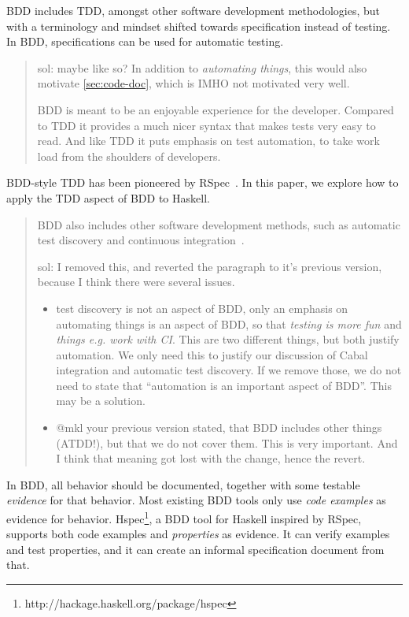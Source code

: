 \documentclass[preprint]{sigplanconf}
\begin{document}
BDD includes TDD, amongst other software development methodologies,
but with a terminology and mindset shifted towards
specification instead of testing.
In BDD, specifications can be used for
automatic testing.

\begin{quote}
    sol: maybe like so?  In addition to \emph{automating things}, this
    would also motivate \ref{sec:code-doc}, which is IMHO not
    motivated very well.

    BDD is meant to be an enjoyable experience for the developer.
    Compared to TDD it provides a much nicer syntax that
    makes tests very easy to read.  And like TDD it puts emphasis on
    test automation, to take work load from the shoulders of
    developers.
\end{quote}

BDD-style TDD has been pioneered by
RSpec~\cite{rspec}.  In this paper, we explore how to apply the TDD
aspect of BDD to Haskell.

\begin{quote}
    BDD also includes other software development methods, such as
    automatic test discovery and continuous integration~\cite{ci}.

    sol: I removed this, and reverted the paragraph to it's previous
    version, because I think there were several issues.

    \begin{itemize}
        \item test discovery is not an aspect of BDD, only an emphasis
            on automating things is an aspect of BDD, so that
            \emph{testing is more fun} and \emph{things e.g. work with
            CI}.  This are two different things, but both justify automation.
            We only need this to justify our discussion of Cabal
            integration and automatic test discovery.  If we remove
            those, we do not need to state that ``automation is an important
            aspect of BDD''.  This may be a solution.
        \item @mkl your previous version stated, that BDD includes
            other things (ATDD!), but that we do not cover them.  This
            is very important.  And I think that meaning got lost with
            the change, hence the revert.
    \end{itemize}
\end{quote}


In BDD, all behavior should be documented, together with some testable
\emph{evidence} for that behavior.  Most existing BDD tools only use
\emph{code examples} as evidence for behavior.
Hspec\footnote{%
http://hackage.haskell.org/package/hspec},
a BDD tool for Haskell inspired by RSpec, supports
both code examples and \emph{properties} as evidence.
It can verify examples and test properties, and it can create an
informal specification document from that.
\end{document}
